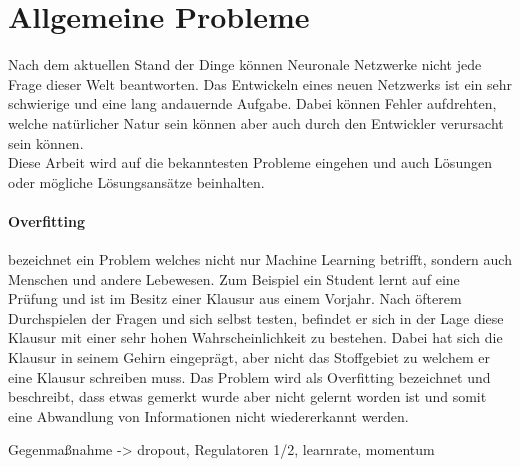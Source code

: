 \section{Allgemeine Probleme}

Nach dem aktuellen Stand der Dinge können Neuronale Netzwerke nicht jede Frage dieser Welt beantworten.
Das Entwickeln eines neuen Netzwerks ist ein sehr schwierige und eine lang andauernde Aufgabe. 
Dabei können Fehler aufdrehten, welche natürlicher Natur sein können aber auch durch den Entwickler verursacht sein können. \\


\noindent
Diese Arbeit wird auf die bekanntesten Probleme eingehen und auch Lösungen oder mögliche Lösungsansätze beinhalten. 


\paragraph{Overfitting} bezeichnet ein Problem welches nicht nur Machine Learning betrifft, sondern auch Menschen und andere Lebewesen. 
Zum Beispiel ein Student lernt auf eine Prüfung und ist im Besitz einer Klausur aus einem Vorjahr. 
Nach öfterem Durchspielen der Fragen und sich selbst testen, befindet er sich in der Lage diese Klausur mit einer sehr hohen Wahrscheinlichkeit zu bestehen. 
Dabei hat sich die Klausur in seinem Gehirn eingeprägt, aber nicht das Stoffgebiet zu welchem er eine Klausur schreiben muss. 
Das Problem wird als Overfitting bezeichnet und beschreibt, dass etwas gemerkt wurde aber nicht gelernt worden ist und somit eine Abwandlung von Informationen nicht wiedererkannt werden.

Gegenmaßnahme -> dropout, Regulatoren 1/2, learnrate, momentum


